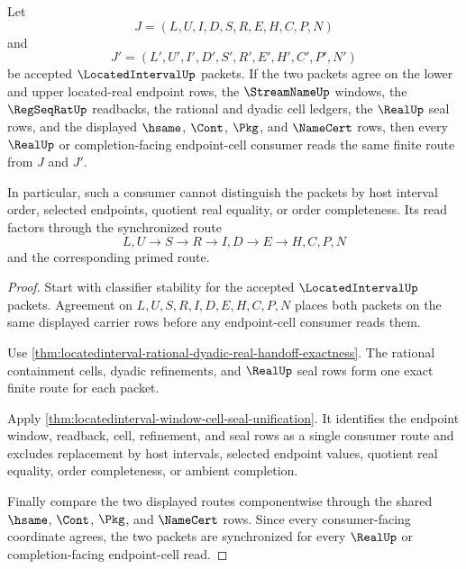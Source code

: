 \begin{theorem}
\label{thm:located-interval-stream-real-cell-synchronization}
Let
$$
J=(L,U,I,D,S,R,E,H,C,P,N)
$$
and
$$
J'=(L',U',I',D',S',R',E',H',C',P',N')
$$
be accepted $\LocatedIntervalUp$ packets. If the two packets agree on the lower and upper located-real endpoint rows, the $\StreamNameUp$ windows, the $\RegSeqRatUp$ readbacks, the rational and dyadic cell ledgers, the $\RealUp$ seal rows, and the displayed $\hsame$, $\Cont$, $\Pkg$, and $\NameCert$ rows, then every $\RealUp$ or completion-facing endpoint-cell consumer reads the same finite route from $J$ and $J'$.

In particular, such a consumer cannot distinguish the packets by host interval order, selected endpoints, quotient real equality, or order completeness. Its read factors through the synchronized route
$$
L,U \to S \to R \to I,D \to E \to H,C,P,N
$$
and the corresponding primed route.
\end{theorem}
\begin{proof}
Start with classifier stability for the accepted $\LocatedIntervalUp$ packets. Agreement on $L,U,S,R,I,D,E,H,C,P,N$ places both packets on the same displayed carrier rows before any endpoint-cell consumer reads them.

Use \autoref{thm:locatedinterval-rational-dyadic-real-handoff-exactness}. The rational containment cells, dyadic refinements, and $\RealUp$ seal rows form one exact finite route for each packet.

Apply \autoref{thm:locatedinterval-window-cell-seal-unification}. It identifies the endpoint window, readback, cell, refinement, and seal rows as a single consumer route and excludes replacement by host intervals, selected endpoint values, quotient real equality, order completeness, or ambient completion.

Finally compare the two displayed routes componentwise through the shared $\hsame$, $\Cont$, $\Pkg$, and $\NameCert$ rows. Since every consumer-facing coordinate agrees, the two packets are synchronized for every $\RealUp$ or completion-facing endpoint-cell read.
\end{proof}

